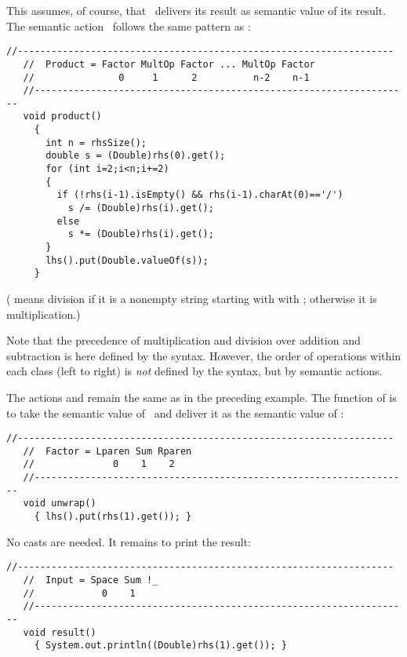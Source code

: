\newpage
This assumes, of course, that \Product\ delivers its result as semantic value
of its result.
The semantic action \Producta\ follows the same pattern as \Suma:

\small
\begin{Verbatim}[frame=single,framesep=2mm,samepage=true,xleftmargin=15mm,xrightmargin=15mm,baselinestretch=0.8]
   //-------------------------------------------------------------------
   //  Product = Factor MultOp Factor ... MultOp Factor 
   //               0     1      2          n-2    n-1
   //-------------------------------------------------------------------
   void product()
     {        
       int n = rhsSize();
       double s = (Double)rhs(0).get();
       for (int i=2;i<n;i+=2)
       {
         if (!rhs(i-1).isEmpty() && rhs(i-1).charAt(0)=='/')
           s /= (Double)rhs(i).get();
         else  
           s *= (Double)rhs(i).get();
       }  
       lhs().put(Double.valueOf(s));
     }
\end{Verbatim}
\normalsize

(
means division if it is a nonempty string starting with with ;
otherwise it is multiplication.)

Note that the precedence of multiplication and division 
over addition and subtraction is here defined by the syntax.
However, the order of operations within each class (left to right)
is \emph{not} defined by the syntax, but by semantic actions.

The actions  and  
remain the same as in the preceding example.
The function of  is to take the semantic value of \Sum\
and deliver it as the semantic value of \Factor:

\small
\begin{Verbatim}[frame=single,framesep=2mm,samepage=true,xleftmargin=15mm,xrightmargin=15mm,baselinestretch=0.8]
   //-------------------------------------------------------------------
   //  Factor = Lparen Sum Rparen 
   //              0    1    2
   //-------------------------------------------------------------------
   void unwrap()
     { lhs().put(rhs(1).get()); }
\end{Verbatim}
\normalsize

No casts are needed.
It remains to print the result:

\small
\begin{Verbatim}[frame=single,framesep=2mm,samepage=true,xleftmargin=15mm,xrightmargin=15mm,baselinestretch=0.8]
   //-------------------------------------------------------------------
   //  Input = Space Sum !_
   //            0    1
   //-------------------------------------------------------------------
   void result()
     { System.out.println((Double)rhs(1).get()); }
\end{Verbatim}
\normalsize

